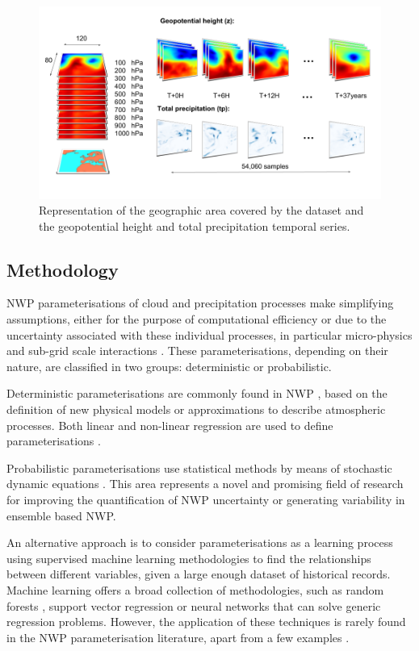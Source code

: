 \documentclass[twocol]{ametsoc}
\begin{document}
\begin{figure}[h]
 \centerline{\includegraphics[width=13cm]{dataset.png}}
  \caption{Representation of the geographic area covered by the dataset and the geopotential height and total precipitation temporal series.}\label{dataset}
\end{figure}

\subsection{Methodology}

NWP parameterisations of cloud and precipitation processes make simplifying assumptions, either for the purpose of computational efficiency or due to the uncertainty associated with these individual processes, in particular micro-physics and sub-grid scale interactions \citep{lopez2007cloud}. These parameterisations, depending on their nature, are classified in two groups: deterministic or probabilistic. 

Deterministic parameterisations are commonly found in NWP \citep{kain2004kain,tiedtke1989comprehensive}, based on the definition of new physical models or approximations to describe atmospheric processes. Both linear and non-linear regression are used to define parameterisations \citep{crawford1999improved,feng20073}. 

Probabilistic parameterisations use statistical methods by means of stochastic dynamic equations \citep{berner2017stochastic}. This area represents a novel and promising field of research for improving the quantification of NWP uncertainty or generating variability in ensemble based NWP.

An alternative approach is to consider parameterisations as a learning process using supervised machine learning methodologies to find the relationships between different variables, given a large enough dataset of historical records. Machine learning offers a broad collection of methodologies, such as random forests \citep{breiman2001random}, support vector regression or neural networks that can solve generic regression problems. However, the application of these techniques is rarely found in the NWP parameterisation literature, apart from a few examples \citep{lipponen2013correction}.
\end{document}
